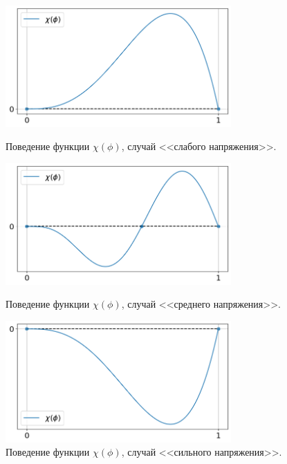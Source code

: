 \begin{figure}[!tp]
	\centering
	\includegraphics[width=0.77\textwidth]{figures/equilibriums_case_1.png}
	\vspace{-0.3cm}
	\caption{Поведение функции $\chi(\phi)$, случай <<слабого напряжения>>.}
	\label{fig:equilibriums_case_1}
	\vspace{0.7cm}
	
	\includegraphics[width=0.77\textwidth]{figures/equilibriums_case_2.png}
	\vspace{-0.3cm}
	\caption{Поведение функции $\chi(\phi)$, случай <<среднего напряжения>>.}
	\label{fig:equilibriums_case_2}
	\vspace{0.7cm}
	
	\includegraphics[width=0.77\textwidth]{figures/equilibriums_case_3.png}
	\vspace{-0.3cm}
	\caption{Поведение функции $\chi(\phi)$, случай <<сильного напряжения>>.}
	\label{fig:equilibriums_case_3}
\end{figure}